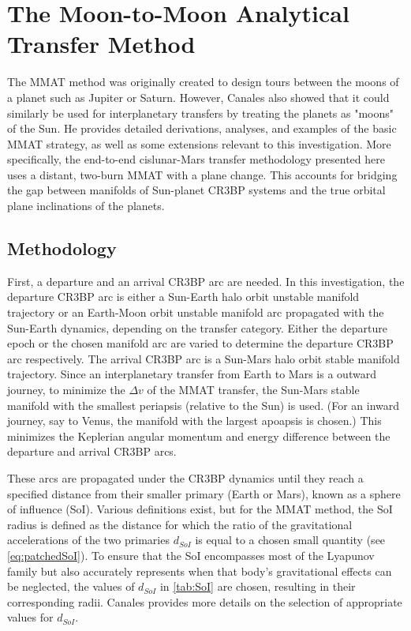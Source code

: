 \section{The Moon-to-Moon Analytical Transfer Method}
The MMAT method was originally created to design tours between the moons of a planet such as
Jupiter or Saturn. However, Canales also showed that it could similarly be used for interplanetary
transfers by treating the planets as "moons" of the Sun. He provides detailed derivations,
analyses, and examples of the basic MMAT strategy, as well as some extensions relevant to this
investigation\cite{Canales:2021a,Canales:2021b,Canales:2022}. More specifically, the end-to-end
cislunar-Mars transfer methodology presented here uses a distant, two-burn MMAT with a plane
change. This accounts for bridging the gap between manifolds of Sun-planet CR3BP systems and the
true orbital plane inclinations of the planets.

\subsection{Methodology}
First, a departure and an arrival CR3BP arc are needed. In this investigation, the departure CR3BP
arc is either a Sun-Earth halo orbit unstable manifold trajectory or an Earth-Moon orbit unstable
manifold arc propagated with the Sun-Earth dynamics, depending on the transfer category. Either the
departure epoch or the chosen manifold arc are varied to determine the departure CR3BP arc
respectively. The arrival CR3BP arc is a Sun-Mars halo orbit stable manifold trajectory. Since an
interplanetary transfer from Earth to Mars is a outward journey, to minimize the $\Delta v$ of the
MMAT transfer, the Sun-Mars stable manifold with the smallest periapsis (relative to the Sun) is
used\cite{Canales:2021b}. (For an inward journey, say to Venus, the manifold with the largest
apoapsis is chosen.) This minimizes the Keplerian angular momentum and energy difference between
the departure and arrival CR3BP arcs.

These arcs are propagated under the CR3BP dynamics until they reach a specified distance from their
smaller primary (Earth or Mars), known as a sphere of influence (SoI). Various definitions exist,
but for the MMAT method, the SoI radius is defined as the distance for which the ratio of the
gravitational accelerations of the two primaries $d_{SoI}$ is equal to a chosen small
quantity (see \cref{eq:patchedSoI})\cite{Canales:2021b}. To ensure that the SoI encompasses most of the Lyapunov family but
also accurately represents when that body's gravitational effects can be neglected, the values of
$d_{SoI}$ in \cref{tab:SoI} are chosen, resulting in their corresponding radii. Canales provides
more details on the selection of appropriate values for $d_{SoI}$\cite{Canales:2021b}.


